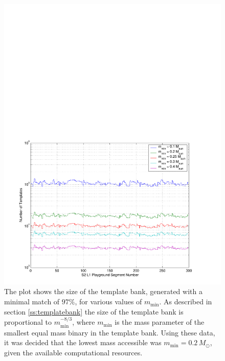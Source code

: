 \begin{figure}[p]
\begin{center}
\includegraphics[width=\linewidth]{figures/result/bank_size}
\end{center}
\caption[MACHO Template Bank Size for Various Lower Masses]{%
\label{f:bank_size}
The plot shows the size of the template bank, generated with a minimal match
of $97\%$, for various values of $m_\mathrm{min}$. As described in section
\ref{ss:templatebank} the size of the template bank is proportional to
$m_\mathrm{min}^{-8/3}$, where $m_\mathrm{min}$ is the mass parameter of the
smallest equal mass binary in the template bank. Using these data, it was
decided that the lowest mass accessible was $m_\mathrm{min} = 0.2\,M_\odot$,
given the available computational resources.}
\end{figure}

